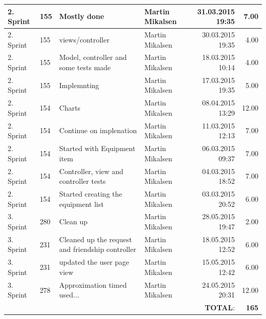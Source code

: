 \documentclass[a4paper]{article}
\begin{document}
\begin{landscape}
\begin{tabular}{|l|l|l|l|r|r|}
2. Sprint & 155 & Mostly done & Martin Mikalsen & 31.03.2015 19:35 & 7.00 \\ \hline
2. Sprint & 155 & views/controller & Martin Mikalsen & 30.03.2015 19:35 & 4.00 \\ \hline
2. Sprint & 155 & Model, controller and some tests made & Martin Mikalsen & 18.03.2015 10:14 & 4.00 \\ \hline
2. Sprint & 155 & Implemnting & Martin Mikalsen & 17.03.2015 19:35 & 5.00 \\ \hline
2. Sprint & 154 & Charts & Martin Mikalsen & 08.04.2015 13:29 & 12.00 \\ \hline
2. Sprint & 154 & Continue on implenation & Martin Mikalsen & 11.03.2015 12:13 & 7.00 \\ \hline
2. Sprint & 154 & Started with Equipment item & Martin Mikalsen & 06.03.2015 09:37 & 7.00 \\ \hline
2. Sprint & 154 & Controller, view and controller tests & Martin Mikalsen & 04.03.2015 18:52 & 7.00 \\ \hline
2. Sprint & 154 & Started creating the equipment list & Martin Mikalsen & 03.03.2015 20:52 & 6.00 \\ \hline
3. Sprint & 280 & Clean up & Martin Mikalsen & 28.05.2015 19:47 & 2.00 \\ \hline
3. Sprint & 231 & Cleaned up the request and friendship controller  & Martin Mikalsen & 18.05.2015 12:52 & 6.00 \\ \hline
3. Sprint & 231 & updated the user page view & Martin Mikalsen & 15.05.2015 12:42 & 6.00 \\ \hline
3. Sprint & 278 & Approximation timed used... & Martin Mikalsen & 24.05.2015 20:31 & 12.00 \\ \hline
 & & & &\textbf{TOTAL}: & \textbf{165} \\ \hline
\end{tabular}





\end{landscape}
\end{document}
